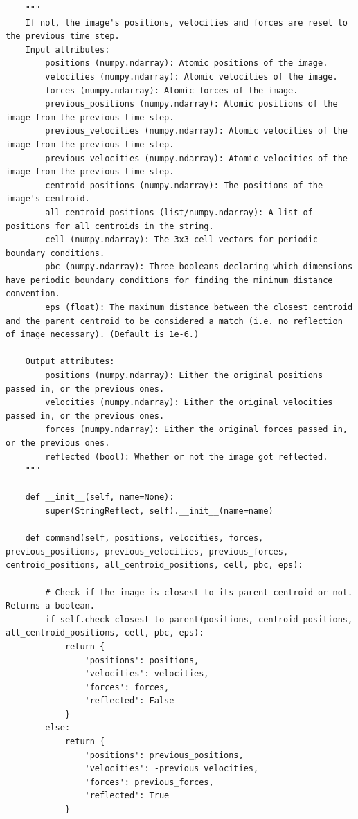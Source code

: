 \documentclass{article}
\begin{document}
{\begin{lstlisting}
    """
    If not, the image's positions, velocities and forces are reset to the previous time step.
    Input attributes:
        positions (numpy.ndarray): Atomic positions of the image.
        velocities (numpy.ndarray): Atomic velocities of the image.
        forces (numpy.ndarray): Atomic forces of the image.
        previous_positions (numpy.ndarray): Atomic positions of the image from the previous time step.
        previous_velocities (numpy.ndarray): Atomic velocities of the image from the previous time step.
        previous_velocities (numpy.ndarray): Atomic velocities of the image from the previous time step.
        centroid_positions (numpy.ndarray): The positions of the image's centroid.
        all_centroid_positions (list/numpy.ndarray): A list of positions for all centroids in the string.
        cell (numpy.ndarray): The 3x3 cell vectors for periodic boundary conditions.
        pbc (numpy.ndarray): Three booleans declaring which dimensions have periodic boundary conditions for finding the minimum distance convention.
        eps (float): The maximum distance between the closest centroid and the parent centroid to be considered a match (i.e. no reflection of image necessary). (Default is 1e-6.)

    Output attributes:
        positions (numpy.ndarray): Either the original positions passed in, or the previous ones.
        velocities (numpy.ndarray): Either the original velocities passed in, or the previous ones.
        forces (numpy.ndarray): Either the original forces passed in, or the previous ones.
        reflected (bool): Whether or not the image got reflected.
    """
    
    def __init__(self, name=None):
        super(StringReflect, self).__init__(name=name)

    def command(self, positions, velocities, forces, previous_positions, previous_velocities, previous_forces, centroid_positions, all_centroid_positions, cell, pbc, eps):
        
        # Check if the image is closest to its parent centroid or not. Returns a boolean.
        if self.check_closest_to_parent(positions, centroid_positions, all_centroid_positions, cell, pbc, eps):
            return {
                'positions': positions,
                'velocities': velocities,
                'forces': forces,
                'reflected': False
            }
        else:
            return {
                'positions': previous_positions,
                'velocities': -previous_velocities,
                'forces': previous_forces,
                'reflected': True
            }
\end{lstlisting}

}
\end{document}
